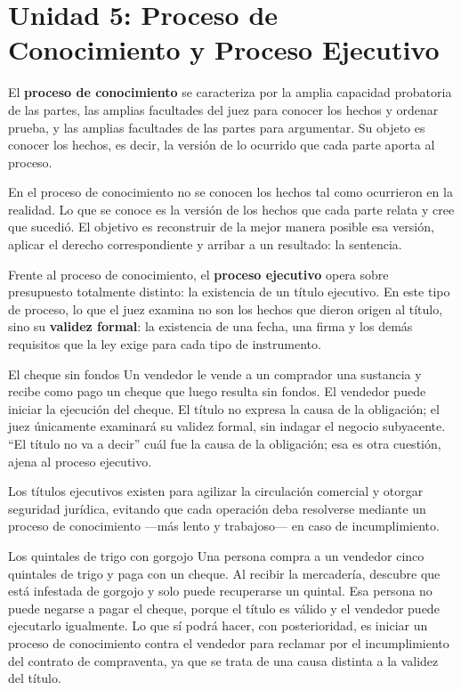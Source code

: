 \documentclass[12pt,oneside]{book}
\begin{document}
\section{Unidad 5: Proceso de Conocimiento y Proceso Ejecutivo}

El \textbf{proceso de conocimiento} se caracteriza por la amplia capacidad probatoria de las partes, las amplias facultades del juez para conocer los hechos y ordenar prueba, y las amplias facultades de las partes para argumentar. Su objeto es conocer los hechos, es decir, la versión de lo ocurrido que cada parte aporta al proceso.

\begin{important}
En el proceso de conocimiento no se conocen los hechos tal como ocurrieron en la realidad. Lo que se conoce es la versión de los hechos que cada parte relata y cree que sucedió. El objetivo es reconstruir de la mejor manera posible esa versión, aplicar el derecho correspondiente y arribar a un resultado: la sentencia.
\end{important}

Frente al proceso de conocimiento, el \textbf{proceso ejecutivo} opera sobre presupuesto totalmente distinto: la existencia de un título ejecutivo. En este tipo de proceso, lo que el juez examina no son los hechos que dieron origen al título, sino su \textbf{validez formal}: la existencia de una fecha, una firma y los demás requisitos que la ley exige para cada tipo de instrumento.

\begin{example}{El cheque sin fondos}
Un vendedor le vende a un comprador una sustancia y recibe como pago un cheque que luego resulta sin fondos. El vendedor puede iniciar la ejecución del cheque. El título no expresa la causa de la obligación; el juez únicamente examinará su validez formal, sin indagar el negocio subyacente. ``El título no va a decir'' cuál fue la causa de la obligación; esa es otra cuestión, ajena al proceso ejecutivo.
\end{example}

Los títulos ejecutivos existen para agilizar la circulación comercial y otorgar seguridad jurídica, evitando que cada operación deba resolverse mediante un proceso de conocimiento ---más lento y trabajoso--- en caso de incumplimiento.

\begin{example}{Los quintales de trigo con gorgojo}
Una persona compra a un vendedor cinco quintales de trigo y paga con un cheque. Al recibir la mercadería, descubre que está infestada de gorgojo y solo puede recuperarse un quintal. Esa persona no puede negarse a pagar el cheque, porque el título es válido y el vendedor puede ejecutarlo igualmente. Lo que sí podrá hacer, con posterioridad, es iniciar un proceso de conocimiento contra el vendedor para reclamar por el incumplimiento del contrato de compraventa, ya que se trata de una causa distinta a la validez del título.
\end{example}
\end{document}
